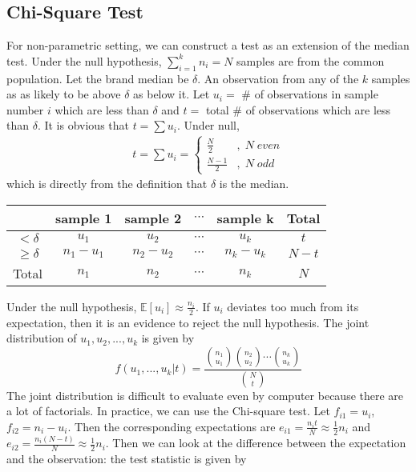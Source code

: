 \documentclass[twoside]{article}
\begin{document}
	\subsection{Chi-Square Test}
	For non-parametric setting, we can construct a test as an extension of the median test. Under the null hypothesis, $\sum_{i=1}^{k} n_i = N$ samples are from the common population. Let the brand median be $\delta$. An observation from any of the $k$ samples as as likely to be above $\delta$ as below it. Let $u_i =$ \# of observations in sample number $i$ which are less than $\delta$ and $t =$ total \# of observations which are less than $\delta$. It is obvious that $t = \sum u_i$. Under null,
	\begin{align*}
		t = \sum u_i = \begin{cases}
			\frac{N}{2}&, \; N \; even \\
			\frac{N-1}{2}&, \; N \; odd
		\end{cases}
	\end{align*}
	which is directly from the definition that $\delta$ is the median. 
	\begin{center}
		\begin{tabular}{|c|c|c|c|c|c|}
			\hline
			& sample 1 & sample 2 & $\cdots$ & sample k & Total\\
			\hline
			$< \delta$ & $u_1$ & $u_2$ & $\cdots$ & $u_k$ & $t$\\
			\hline
			$\geqslant \delta$ & $n_1 - u_1$ & $n_2 - u_2$ & $\cdots$ & $n_k - u_k$ & $N-t$ \\
			\hline
			Total & $n_1$ & $n_2$ & $\cdots$ & $n_k$ & $N$ \\
			\hline
		\end{tabular}
	\end{center}
	Under the null hypothesis, $\mathbb{E} \left[ u_i \right] \approx \frac{n_i}{2}$. If $u_i$ deviates too much from its expectation, then it is an evidence to reject the null hypothesis. The joint distribution of $u_1, u_2, ..., u_k$ is given by
	$$
	f(u_1, ..., u_k | t) = \frac{\binom{n_1}{u_1} \binom{n_2}{u_2} \cdots \binom{n_k}{u_k}}{\binom{N}{t}}
	$$
	The joint distribution is difficult to evaluate even by computer because there are a lot of factorials. In practice, we can use the Chi-square test. Let $f_{i1} = u_i$, $f_{i2} = n_i - u_i$. Then the corresponding expectations are $e_{i1} = \frac{n_i t}{N} \approx \frac{1}{2} n_i$ and $e_{i2} = \frac{n_i (N-t)}{N} \approx \frac{1}{2} n_i$. Then we can look at the difference between the expectation and the observation: the test statistic is given by
\end{document}
